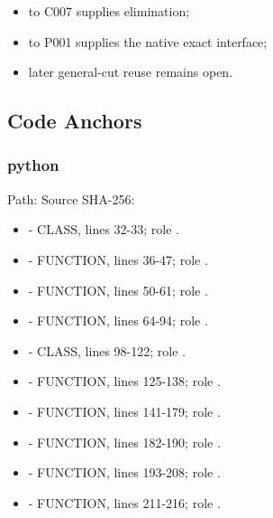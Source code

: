\begin{itemize}
\tightlist
\item
  \texttt{\protect{}} to C007 supplies elimination;
\item
  \texttt{\protect{}} to P001 supplies the native exact interface;
\item
  later general-cut reuse remains open.
\end{itemize}

\subsection{Code Anchors}\label{code-anchors-12}

\subsubsection{python}\label{python-3}

Path:
Source SHA-256:
\texttt{\protect{}}

\begin{itemize}
\tightlist
\item
  \texttt{\protect{}} - CLASS, lines 32-33; role
  \texttt{\protect{}}.
\item
  \texttt{\protect{}} - FUNCTION, lines 36-47; role
  \texttt{\protect{}}.
\item
  \texttt{\protect{}} - FUNCTION, lines 50-61; role
  \texttt{\protect{}}.
\item
  \texttt{\protect{}} - FUNCTION, lines 64-94; role
  \texttt{\protect{}}.
\item
  \texttt{\protect{}} - CLASS, lines 98-122; role
  \texttt{\protect{}}.
\item
  \texttt{\protect{}} - FUNCTION, lines 125-138; role
  \texttt{\protect{}}.
\item
  \texttt{\protect{}} - FUNCTION, lines 141-179; role
  \texttt{\protect{}}.
\item
  \texttt{\protect{}} - FUNCTION, lines 182-190; role
  \texttt{\protect{}}.
\item
  \texttt{\protect{}} - FUNCTION, lines 193-208;
  role \texttt{\protect{}}.
\item
  \texttt{\protect{}} - FUNCTION, lines 211-216; role
  \texttt{\protect{}}.
\end{itemize}

